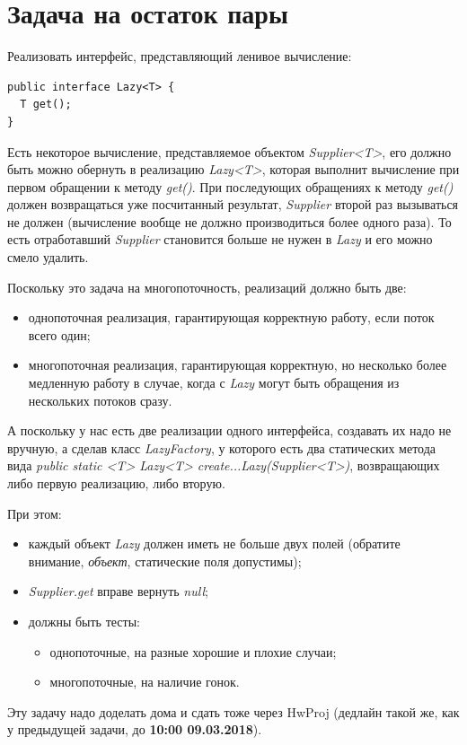 \documentclass[a5paper]{article}
\begin{document}
\section{Задача на остаток пары}

Реализовать интерфейс, представляющий ленивое вычисление:

\begin{verbatim}
public interface Lazy<T> {
  T get();
}
\end{verbatim}

Есть некоторое вычисление, представляемое объектом \textit{Supplier<T>}, его должно быть можно обернуть в реализацию \textit{Lazy<T>}, которая выполнит вычисление при первом обращении к методу \textit{get()}. При последующих обращениях к методу \textit{get()} должен возвращаться уже посчитанный результат, \textit{Supplier} второй раз вызываться не должен (вычисление вообще не должно производиться более одного раза). То есть отработавший \textit{Supplier} становится больше не нужен в \textit{Lazy} и его можно смело удалить.

Поскольку это задача на многопоточность, реализаций должно быть две:
\begin{itemize}
	\item однопоточная реализация, гарантирующая корректную работу, если поток всего один;
	\item многопоточная реализация, гарантирующая корректную, но несколько более медленную работу в случае, когда с \textit{Lazy} могут быть обращения из нескольких потоков сразу.
\end{itemize}

А поскольку у нас есть две реализации одного интерфейса, создавать их надо не вручную, а сделав класс \textit{LazyFactory}, у которого есть два статических метода вида \textit{public static <T> Lazy<T> create...Lazy(Supplier<T>)}, возвращающих либо первую реализацию, либо вторую.

При этом:
\begin{itemize}
	\item каждый объект \textit{Lazy} должен иметь не больше двух полей (обратите внимание, \textit{объект}, статические поля допустимы);
	\item \textit{Supplier.get} вправе вернуть \textit{null};
	\item должны быть тесты:
	\begin{itemize}
		\item однопоточные, на разные хорошие и плохие случаи;
		\item многопоточные, на наличие гонок.
	\end{itemize}
\end{itemize}

Эту задачу надо доделать дома и сдать тоже через HwProj (дедлайн такой же, как у предыдущей задачи, до \textbf{10:00 09.03.2018}).
\end{document}
